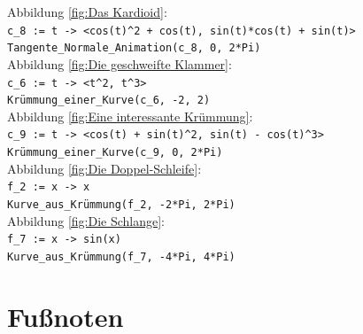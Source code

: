 \documentclass[12pt]{article}
\begin{document}
\begin{scriptsize}
Abbildung \ref{fig:Das Kardioid}:\\
\texttt{c\_8 := t -> <cos(t)\^{}2 + cos(t), sin(t)*cos(t) + sin(t)>}\\
\texttt{Tangente\_Normale\_Animation(c\_8, 0, 2*Pi)}\\

Abbildung \ref{fig:Die geschweifte Klammer}:\\
\texttt{c\_6 := t -> <t\^{}2, t\^{}3>}\\
\texttt{Krümmung\_einer\_Kurve(c\_6, -2, 2)}\\

Abbildung \ref{fig:Eine interessante Krümmung}:\\
\texttt{c\_9 := t -> <cos(t) + sin(t)\^{}2, sin(t) - cos(t)\^{}3>}\\
\texttt{Krümmung\_einer\_Kurve(c\_9, 0, 2*Pi)}\\

Abbildung \ref{fig:Die Doppel-Schleife}:\\
\texttt{f\_2 := x -> x}\\
\texttt{Kurve\_aus\_Krümmung(f\_2, -2*Pi, 2*Pi)}\\

Abbildung \ref{fig:Die Schlange}:\\
\texttt{f\_7 := x -> sin(x)}\\
\texttt{Kurve\_aus\_Krümmung(f\_7, -4*Pi, 4*Pi)}
\end{scriptsize}

\newpage

\section{Fußnoten}
\theendnotes
\end{document}
